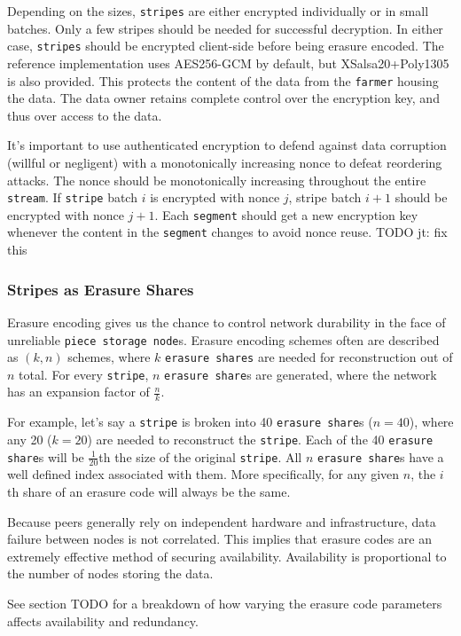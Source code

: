 \documentclass[a4paper,10pt]{article} \usepackage[utf8]{inputenc}
\newcommand{\x}[1]{{\tt #1}} \newcommand{\code}[1]{{\tt #1}}
\newcommand{\todo}[1]{{\color{red} TODO #1 }}
\begin{document}
Depending on the sizes, \x{stripes} are either encrypted individually or in
small batches. Only a few stripes should be needed for successful
decryption. In either case, \x{stripes} should be encrypted client-side before
being erasure encoded. The reference implementation uses AES256-GCM by default,
but XSalsa20+Poly1305 is also provided. This protects the
content of the data from the \x{farmer} housing the data. The data owner
retains complete control over the encryption key, and thus over access to the
data.

It's important to use authenticated encryption to defend against data corruption
(willful or negligent) with a monotonically increasing nonce to defeat
reordering attacks. The nonce should be monotonically increasing throughout
the entire \x{stream}. If \x{stripe} batch $i$ is encrypted
with nonce $j$, stripe batch $i+1$ should be encrypted with nonce $j+1$. Each
\x{segment} should get a new encryption key whenever the content in the
\x{segment} changes to avoid nonce reuse. \todo{jt: fix this}

\subsubsection{Stripes as Erasure Shares}

Erasure encoding gives us the chance to control network durability in the face
of unreliable \x{piece storage node}s. Erasure encoding schemes often are
described as $(k, n)$ schemes, where $k$ \x{erasure shares} are needed for
reconstruction out of $n$ total. For every \x{stripe}, $n$ \x{erasure share}s
are generated, where the network has an expansion factor of $\frac{n}{k}$.

For example, let's say a \x{stripe} is broken into 40 \x{erasure share}s
($n=40$), where any 20 ($k=20$) are needed to reconstruct the \x{stripe}. Each
of the 40 \x{erasure share}s will be $\frac{1}{20}$th the size of the original
\x{stripe}. All $n$ \x{erasure share}s have a well defined index associated
with them. More specifically, for any given $n$, the $i$th share of an erasure code will always be the same.

Because peers generally rely on independent hardware and infrastructure, data
failure between nodes is not correlated. This implies that erasure codes are an extremely effective method of securing availability. Availability is proportional to the number of nodes storing the data.

See section \todo{} for a breakdown of how varying the erasure code parameters
affects availability and redundancy.
\end{document}
